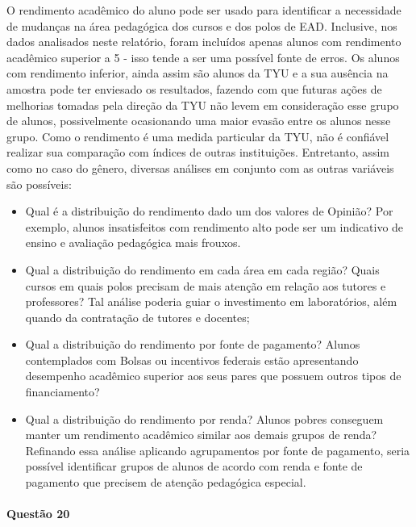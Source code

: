 \documentclass[10pt,a4paper,oneside]{article}
\begin{document}
O rendimento acadêmico do aluno pode ser usado para identificar a necessidade de mudanças na área pedagógica dos cursos e dos polos de EAD. Inclusive, nos dados analisados neste relatório, foram incluídos apenas alunos com rendimento acadêmico superior a 5 - isso tende a ser uma possível fonte de erros. Os alunos com rendimento inferior, ainda assim são alunos da TYU e a sua ausência na amostra pode ter enviesado os resultados, fazendo com que futuras ações de melhorias tomadas pela direção da TYU não levem em consideração esse grupo de alunos, possivelmente ocasionando uma maior evasão entre os alunos nesse grupo. Como o rendimento é uma medida particular da TYU, não é confiável realizar sua comparação com índices de outras instituições. Entretanto, assim como no caso do gênero, diversas análises em conjunto com as outras variáveis são possíveis:
\begin{itemize}
	\item Qual é a distribuição do rendimento dado um dos valores de Opinião? Por exemplo, alunos insatisfeitos com rendimento alto pode ser um indicativo de ensino e avaliação pedagógica mais frouxos.
	\item Qual a distribuição do rendimento em cada área em cada região? Quais cursos em quais polos precisam de mais atenção em relação aos tutores e professores? Tal análise poderia guiar o investimento em laboratórios, além quando da contratação de tutores e docentes;
	\item Qual a distribuição do rendimento por fonte de pagamento? Alunos contemplados com Bolsas ou incentivos federais estão apresentando desempenho acadêmico superior aos seus pares que possuem outros tipos de financiamento? 
	\item Qual a distribuição do rendimento por renda? Alunos pobres conseguem manter um rendimento acadêmico similar aos demais grupos de renda? Refinando essa análise aplicando agrupamentos por fonte de pagamento, seria possível identificar grupos de alunos de acordo com renda e fonte de pagamento que precisem de atenção pedagógica especial.
\end{itemize}

\FloatBarrier
\paragraph{Questão 20}


\end{document}

